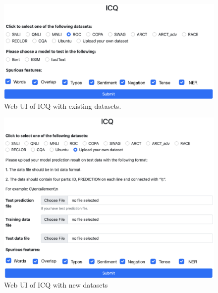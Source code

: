 

\begin{figure}[th]
\centering
\includegraphics[width=1.0\columnwidth]{picture/dataset1.eps}
\caption{Web UI of ICQ with existing datasets.}%
\label{fig:dataset1}
\end{figure}

\begin{figure}[th]
\centering
\includegraphics[width=1.0\columnwidth]{picture/dataset.eps}
\caption{Web UI of ICQ with new datasets}%
\label{fig:dataset}
\end{figure}

